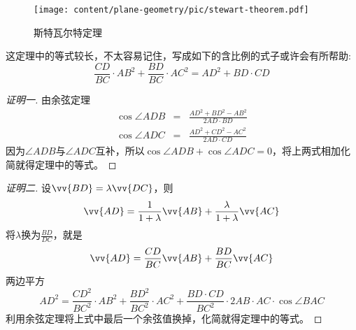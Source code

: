 \begin{figure}[htbp]
\centering
\texttt{[image: content/plane-geometry/pic/stewart-theorem.pdf]}
\caption{斯特瓦尔特定理}
\label{fig:stewart-theorem}
\end{figure}

这定理中的等式较长，不太容易记住，写成如下的含比例的式子或许会有所帮助:
\begin{equation}
  \label{eq:stewart-theorem-rate}
  \frac{CD}{BC}\cdot AB^2 + \frac{BD}{BC} \cdot AC^2 = AD^2 + BD \cdot CD
\end{equation}

\begin{proof}[证明一]
  由余弦定理
  \begin{eqnarray*}
    \cos{\angle ADB} & = & \frac{AD^2+BD^2-AB^2}{2 AD \cdot BD} \\
    \cos{\angle ADC} & = & \frac{AD^2+CD^2-AC^2}{2 AD \cdot CD} 
  \end{eqnarray*}
  因为$\angle ADB$与$\angle ADC$互补，所以$\cos{\angle ADB} + \cos{\angle ADC} = 0$，将上两式相加化简就得定理中的等式。
\end{proof}

\begin{proof}[证明二]
  设$\vv{BD}=\lambda \vv{DC}$，则
  \begin{equation*}
    \vv{AD}=\frac{1}{1+\lambda}\vv{AB}+\frac{\lambda}{1+\lambda}\vv{AC}
  \end{equation*}
  将$\lambda$换为$\frac{BD}{DC}$，就是
  \begin{equation*}
    \vv{AD}=\frac{CD}{BC}\vv{AB}+\frac{BD}{BC}\vv{AC}
  \end{equation*}
  两边平方
  \begin{equation*}
    AD^2=\frac{CD^2}{BC^2} \cdot AB^2 + \frac{BD^2}{BC^2} \cdot AC^2 + \frac{ BD \cdot CD}{BC^2} \cdot 2 AB \cdot AC \cdot \cos{\angle BAC}
  \end{equation*}
  利用余弦定理将上式中最后一个余弦值换掉，化简就得定理中的等式。
\end{proof}

